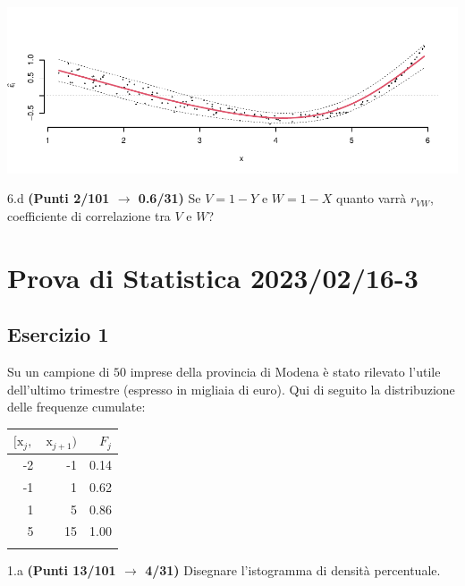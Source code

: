 \documentclass[
  11pt,
]{book}
\theoremstyle{mytheoremstyle}
\theoremstyle{mydefstyle}
\newenvironment{sol}
  {
  \begin{tcolorbox}[enhanced,breakable,arc=0.1mm,boxrule=1pt,colback=white,colframe=iblue,
  title=\bf \fontfamily{lmss}\selectfont \hspace{.5 cm} Soluzione,drop fuzzy shadow]

}{
\end{tcolorbox}
  }
\begin{document}
\begin{sol}

\begin{center}\includegraphics{Esami_passati_con_soluzioni_files/figure-latex/2023-26,-1} \end{center}

\end{sol}

6.d \textbf{(Punti 2/101 \(\rightarrow\) 0.6/31)} Se \(V= 1 - Y\) e \(W= 1 - X\) quanto varrà \(r_{VW}\), coefficiente di correlazione tra \(V\) e \(W\)?

\section{Prova di Statistica 2023/02/16-3}\label{prova-di-statistica-20230216-3}

\subsection{Esercizio 1}\label{esercizio-1-24}

Su un campione di \(50\) imprese della provincia di Modena è stato rilevato l'utile dell'ultimo trimestre (espresso in migliaia di euro). Qui di seguito la distribuzione delle frequenze cumulate:

\begin{table}[H]
\centering
\begin{tabular}{rrr}
\toprule
$[\text{x}_j,$ & $\text{x}_{j+1})$ & $F_j$\\
\midrule
-2 & -1 & 0.14\\
-1 & 1 & 0.62\\
1 & 5 & 0.86\\
5 & 15 & 1.00\\
 &  & \\
\bottomrule
\end{tabular}
\end{table}

1.a \textbf{(Punti 13/101 \(\rightarrow\) 4/31)} Disegnare l'istogramma di densità percentuale.
\end{document}
